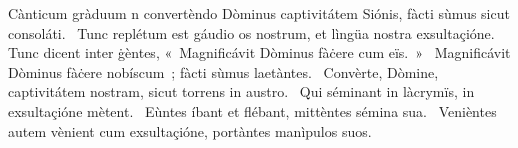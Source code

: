 { Cànticum gràduum}
{%
n convertèndo Dòminus captivitátem Siónis, fàcti sùmus sicut consoláti. 
~Tunc replétum est gáudio os nostrum, et lìngüa nostra exsultaçióne. Tunc dicent inter ġèntes, «~Magnificávit Dòminus fàċere cum eïs.~»
~Magnificávit Dòminus fàċere nobíscum~; fàcti sùmus laetàntes. 
~Convèrte, Dòmine, captivitátem nostram, sicut torrens in austro. 
~Qui séminant in làcrymïs, in exsultaçióne mètent. 
~Eùntes íbant et flébant, mittèntes sémina sua. 
~Venièntes autem vènient cum exsultaçióne, portàntes manìpulos suos. 
}
